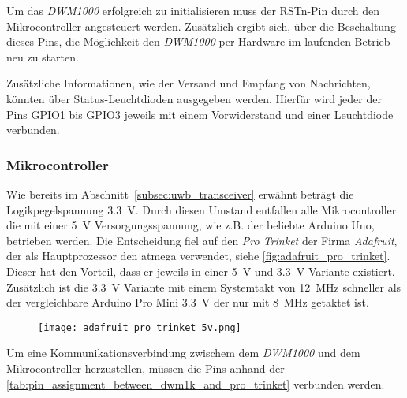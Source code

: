 Um das \textit{DWM1000} erfolgreich zu initialisieren muss der RSTn-Pin durch den Mikrocontroller angesteuert werden. Zusätzlich ergibt sich, über die Beschaltung dieses Pins, die Möglichkeit den \textit{DWM1000} per Hardware im laufenden Betrieb neu zu starten.

Zusätzliche Informationen, wie der Versand und Empfang von Nachrichten, könnten über Status-Leuchtdioden ausgegeben werden. Hierfür wird jeder der Pins GPIO1 bis GPIO3 jeweils mit einem Vorwiderstand und einer Leuchtdiode verbunden.


%
%
%
\subsubsection{Mikrocontroller}

Wie bereits im Abschnitt~\ref{subsec:uwb_transceiver} erwähnt beträgt die Logikpegelspannung \SI{3.3}{\volt}. Durch diesen Umstand entfallen alle Mikrocontroller die mit einer \SI{5}{\volt} Versorgungsspannung, wie z.B. der beliebte Arduino Uno, betrieben werden. Die Entscheidung fiel auf den \textit{Pro Trinket}\footnotemark{} der Firma \textit{Adafruit}, der als Hauptprozessor den \Gls{atmega} verwendet, siehe \autoref{fig:adafruit_pro_trinket}. Dieser hat den Vorteil, dass er jeweils in einer \SI{5}{\volt} und \SI{3.3}{\volt} Variante existiert. Zusätzlich ist die \SI{3.3}{\volt} Variante mit einem Systemtakt von \SI{12}{\MHz} schneller als der vergleichbare Arduino Pro Mini \SI{3.3}{\volt} der nur mit \SI{8}{\MHz} getaktet ist.

\begin{figure}
	\centering
	\texttt{[image: adafruit\_pro\_trinket\_5v.png]}
	\label{fig:adafruit_pro_trinket}
\end{figure}


Um eine Kommunikationsverbindung zwischem dem \textit{DWM1000} und dem Mikrocontroller herzustellen, müssen die Pins anhand der \autoref{tab:pin_assignment_between_dwm1k_and_pro_trinket} verbunden werden.


